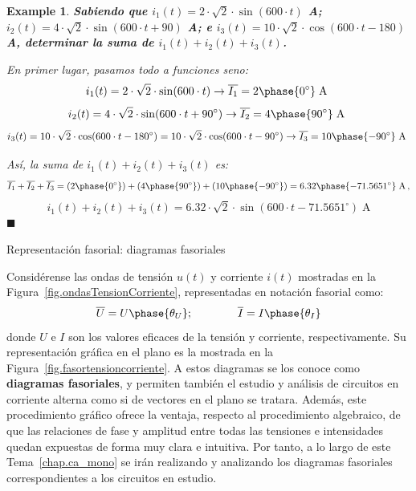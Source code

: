 \documentclass[11pt]{book} %
\makeatletter
\numberwithin{dummy}{section}
\theoremstyle{ocrenumbox}
\theoremstyle{blacknumex}
\newtheorem{exampleT}{Example}[chapter]
\theoremstyle{blacknumbox}
\theoremstyle{ocrenum}
\newenvironment{example}{\begin{exampleT}}{\hfill{\tiny\ensuremath{\blacksquare}}\end{exampleT}}
\renewcommand{\subsection}{\@startsection {subsection}{2}{\z@}
{-3ex \@plus -0.1ex \@minus -.4ex}
{0.5ex \@plus.2ex }
{\normalfont\sffamily\bfseries}}
\newlength\esp
\makeatother
\begin{document}
	\vspace{4mm}
	\begin{example}
		\textbf{Sabiendo que $i_1(t)=2\cdot\sqrt{2}\cdot \sin(600\cdot t)$ A; $i_2(t)=4\cdot\sqrt{2}\cdot \sin(600\cdot t+90)$ A; e $i_3(t)=10\cdot\sqrt{2}\cdot \cos(600\cdot t-180)$ A, determinar la suma de $i_1(t)+i_2(t)+i_3(t)$.}
		
		En primer lugar, pasamos todo a funciones seno: 
		\begin{equation*}
			i_1(t)=2\cdot\sqrt{2}\cdot \sin(600\cdot t)\rightarrow \overline{I_1}=2\phase{0^\circ}\;\text{A}\
		\end{equation*}
		\begin{equation*}
			i_2(t)=4\cdot\sqrt{2}\cdot \sin(600\cdot t+90^\circ)\rightarrow \overline{I_2}=4\phase{90^\circ}\;\text{A}\
		\end{equation*}
		\begin{equation*}
			i_3(t)=10\cdot\sqrt{2}\cdot \cos(600\cdot t-180^\circ)=10\cdot\sqrt{2}\cdot \cos(600\cdot t-90^\circ)\rightarrow \overline{I_3}=10\phase{-90^\circ}\;\text{A}\
		\end{equation*}
		
		Así, la suma de $i_1(t)+i_2(t)+i_3(t)$ es:
		\begin{equation*}
			\overline{I_1}+\overline{I_2}+\overline{I_3}=(2\phase{0^\circ})+(4\phase{90^\circ})+(10\phase {-90^\circ})=6.32\phase{-71.5651^\circ}\;\text{A} \,,
		\end{equation*}
		\begin{equation*}
			i_1(t)+i_2(t)+i_3(t)=6.32\cdot\sqrt{2}\cdot \sin(600\cdot t-71.5651^\circ)\;\text{A}
		\end{equation*}
	\end{example}
	
	\subsection{Representación fasorial: diagramas fasoriales}
	
	Considérense las ondas de tensión $u(t)$ y corriente $i(t)$ mostradas en la Figura~\ref{fig.ondasTensionCorriente}, representadas en notación fasorial como:
	\begin{equation*}
		\overline{U} = U\phase{\theta_U};\qquad\qquad   \overline{I} = I\phase{\theta_I}
	\end{equation*}
	donde $U$ e $I$ son los valores eficaces de la tensión y corriente, respectivamente. Su representación gráfica en el plano es la mostrada en la Figura~\ref{fig.fasortensioncorriente}. A estos diagramas se los conoce como \textbf{diagramas fasoriales}, y permiten también el estudio y análisis de circuitos en corriente alterna como si de vectores en el plano se tratara. Además, este procedimiento gráfico ofrece la ventaja, respecto al procedimiento algebraico, de que las relaciones de fase y amplitud entre todas las tensiones e intensidades quedan expuestas de forma muy clara e intuitiva. Por tanto, a lo largo de este Tema~\ref{chap.ca_mono} se irán realizando y analizando los diagramas fasoriales correspondientes a los circuitos en estudio.
	
\end{document}
